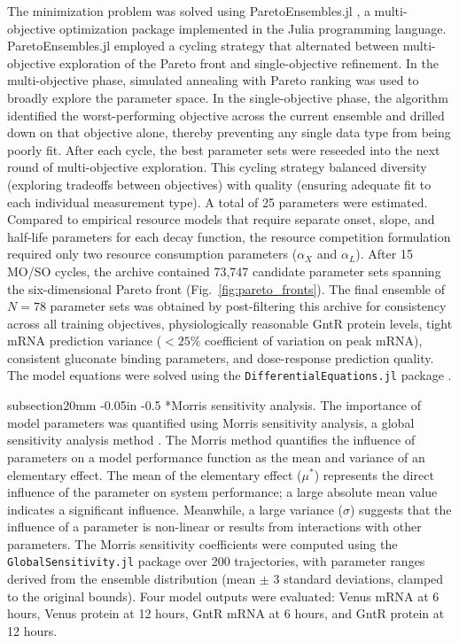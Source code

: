 \documentclass[12pt]{article}
\makeatletter
\renewcommand\subsection{\@startsection
	{subsection}{2}{0mm}
	{-0.05in}
	{-0.5\baselineskip}
	{\normalfont\normalsize\bfseries}}
\makeatother
\begin{document}
The minimization problem was solved using ParetoEnsembles.jl \cite{Varner:2026aa}, a multi-objective optimization package implemented in the Julia programming language. ParetoEnsembles.jl employed a cycling strategy that alternated between multi-objective exploration of the Pareto front and single-objective refinement. In the multi-objective phase, simulated annealing with Pareto ranking was used to broadly explore the parameter space. In the single-objective phase, the algorithm identified the worst-performing objective across the current ensemble and drilled down on that objective alone, thereby preventing any single data type from being poorly fit. After each cycle, the best parameter sets were reseeded into the next round of multi-objective exploration. This cycling strategy balanced diversity (exploring tradeoffs between objectives) with quality (ensuring adequate fit to each individual measurement type). A total of 25 parameters were estimated. Compared to empirical resource models that require separate onset, slope, and half-life parameters for each decay function, the resource competition formulation required only two resource consumption parameters ($\alpha_X$ and $\alpha_L$). After 15 MO/SO cycles, the archive contained 73,747 candidate parameter sets spanning the six-dimensional Pareto front (Fig.~\ref{fig:pareto_fronts}). The final ensemble of $N = 78$ parameter sets was obtained by post-filtering this archive for consistency across all training objectives, physiologically reasonable GntR protein levels, tight mRNA prediction variance ($< 25\%$ coefficient of variation on peak mRNA), consistent gluconate binding parameters, and dose-response prediction quality. The model equations were solved using the \texttt{DifferentialEquations.jl} package \cite{rackauckas2017differentialequations}.

\subsection*{Morris sensitivity analysis.}
The importance of model parameters was quantified using Morris sensitivity analysis, a global sensitivity analysis method \cite{morris1991factorial}. The Morris method quantifies the influence of parameters on a model performance function as the mean and variance of an elementary effect. The mean of the elementary effect ($\mu^{*}$) represents the direct influence of the parameter on system performance; a large absolute mean value indicates a significant influence. Meanwhile, a large variance ($\sigma$) suggests that the influence of a parameter is non-linear or results from interactions with other parameters. The Morris sensitivity coefficients were computed using the \texttt{GlobalSensitivity.jl} package \cite{dixit2022globalsensitivity} over 200 trajectories, with parameter ranges derived from the ensemble distribution (mean $\pm$ 3 standard deviations, clamped to the original bounds). Four model outputs were evaluated: Venus mRNA at 6 hours, Venus protein at 12 hours, GntR mRNA at 6 hours, and GntR protein at 12 hours.
\end{document}
